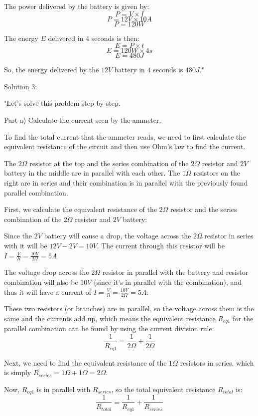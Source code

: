 The power delivered by the battery is given by:
\[ P = V \times I \]
\[ P = 12V \times 10A \]
\[ P = 120W \]

The energy \( E \) delivered in \( 4 \) seconds is then:
\[ E = P \times t \]
\[ E = 120W \times 4s \]
\[ E = 480J \]

So, the energy delivered by the \(12V\) battery in \(4\) seconds is \(480J\)."

Solution 3:

"Let's solve this problem step by step.

Part a) Calculate the current seen by the ammeter.

To find the total current that the ammeter reads, we need to first calculate the equivalent resistance of the circuit and then use Ohm's law to find the current.

The \(2\Omega\) resistor at the top and the series combination of the \(2\Omega\) resistor and \(2V\) battery in the middle are in parallel with each other. The \(1\Omega\) resistors on the right are in series and their combination is in parallel with the previously found parallel combination.

First, we calculate the equivalent resistance of the \(2\Omega\) resistor and the series combination of the \(2\Omega\) resistor and \(2V\) battery:

Since the \(2V\) battery will cause a drop, the voltage across the \(2\Omega\) resistor in series with it will be \( 12V - 2V = 10V \). The current through this resistor will be \( I = \frac{V}{R} = \frac{10V}{2\Omega} = 5A \).

The voltage drop across the \(2\Omega\) resistor in parallel with the battery and resistor combination will also be \(10V\) (since it's in parallel with the combination), and thus it will have a current of \( I = \frac{V}{R} = \frac{10V}{2\Omega} = 5A \).

These two resistors (or branches) are in parallel, so the voltage across them is the same and the currents add up, which means the equivalent resistance \( R_{eq1} \) for the parallel combination can be found by using the current division rule:
\[ \frac{1}{R_{eq1}} = \frac{1}{2\Omega} + \frac{1}{2\Omega} \]

Next, we need to find the equivalent resistance of the \(1\Omega\) resistors in series, which is simply \( R_{series} = 1\Omega + 1\Omega = 2\Omega \).

Now, \( R_{eq1} \) is in parallel with \( R_{series} \), so the total equivalent resistance \( R_{total} \) is:
\[ \frac{1}{R_{total}} = \frac{1}{R_{eq1}} + \frac{1}{R_{series}} \]

